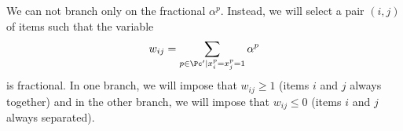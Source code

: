 We can not branch only on the fractional $\alpha^p$. Instead, we will select a pair $(i,j)$ of items such that the variable
\begin{equation*}
	w_{ij} = \sum_{p \in \Pc' | x_i^p=x_j^p=1} \alpha^p
\end{equation*}
is fractional. In one branch, we will impose that $w_{ij} \geq 1$ (items $i$ and $j$ always together) and in the other branch, we will impose that $w_{ij} \leq 0$ (items $i$ and $j$ always separated).
